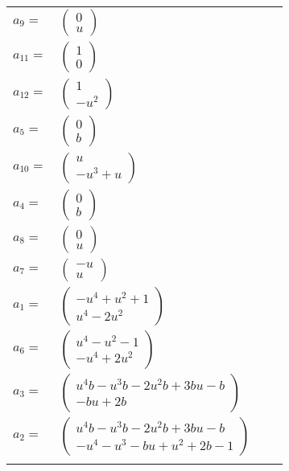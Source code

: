 \documentclass[1p]{elsarticle_modified}
\theoremstyle{definition}
\begin{document}
\begin{tabular}{m{7pt} m{180pt} m{7pt} m{180pt} }
\flushright $a_{9}=$&$\begin{pmatrix}0\\u\end{pmatrix}$ \\
\flushright $a_{11}=$&$\begin{pmatrix}1\\0\end{pmatrix}$ \\
\flushright $a_{12}=$&$\begin{pmatrix}1\\- u^2\end{pmatrix}$ \\
\flushright $a_{5}=$&$\begin{pmatrix}0\\b\end{pmatrix}$ \\
\flushright $a_{10}=$&$\begin{pmatrix}u\\- u^3+u\end{pmatrix}$ \\
\flushright $a_{4}=$&$\begin{pmatrix}0\\b\end{pmatrix}$ \\
\flushright $a_{8}=$&$\begin{pmatrix}0\\u\end{pmatrix}$ \\
\flushright $a_{7}=$&$\begin{pmatrix}- u\\u\end{pmatrix}$ \\
\flushright $a_{1}=$&$\begin{pmatrix}- u^4+u^2+1\\u^4-2 u^2\end{pmatrix}$ \\
\flushright $a_{6}=$&$\begin{pmatrix}u^4- u^2-1\\- u^4+2 u^2\end{pmatrix}$ \\
\flushright $a_{3}=$&$\begin{pmatrix}u^4 b- u^3 b-2 u^2 b+3 b u- b\\- b u+2 b\end{pmatrix}$ \\
\flushright $a_{2}=$&$\begin{pmatrix}u^4 b- u^3 b-2 u^2 b+3 b u- b\\- u^4- u^3- b u+u^2+2 b-1\end{pmatrix}$\\&\end{tabular}
\end{document}
